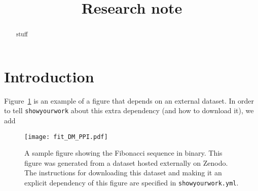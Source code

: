 \documentclass[twocolumn,twocolappendix,trackchanges]{aastex63}
\begin{document}
\title{Research note}

\graphicspath{{./figures/}}

\begin{abstract}
  stuff
\end{abstract}

\section{Introduction}

Figure~\ref{fig:fit_DM_PPI} is an example of a figure that depends on an external dataset.
In order to tell \texttt{showyourwork} about this extra dependency (and how to download it), we add %

\begin{figure}[ht!]
    \begin{centering}
      \texttt{[image: fit\_DM\_PPI.pdf]}
        \caption{A sample figure showing the Fibonacci sequence in binary.
            This figure was generated from a dataset hosted externally on Zenodo.
            The instructions for downloading this dataset and making it an explicit dependency of this figure are specified in \texttt{showyourwork.yml}.}
        \label{fig:fit_DM_PPI}
    \end{centering}
\end{figure}
\end{document}
